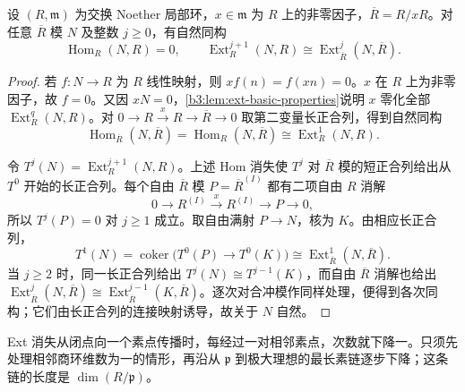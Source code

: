 \begin{lemma}[正则元换环]\label{b3:lem:regular-element-ext-change}
	设 \((R,\mathfrak m)\) 为交换 Noether 局部环，\(x\in\mathfrak m\) 为 \(R\) 上的非零因子，\(\overline R=R/xR\)。对任意 \(\overline R\) 模 \(N\) 及整数 \(j\ge0\)，有自然同构
	\[
		\operatorname{Hom}_R(N,R)=0,\qquad \operatorname{Ext}_R^{j+1}(N,R) \cong\operatorname{Ext}_{\overline R}^j(N,\overline R).
	\]
\end{lemma}
\begin{proof}
	若 \(f:N\rightarrow R\) 为 \(R\) 线性映射，则 \(xf(n)=f(xn)=0\)。\(x\) 在 \(R\) 上为非零因子，故 \(f=0\)。又因 \(xN=0\)，\cref{b3:lem:ext-basic-properties}说明 \(x\) 零化全部 \(\operatorname{Ext}_R^q(N,R)\)。对 \(0\rightarrow R\xrightarrow{x}R\rightarrow\overline R\rightarrow0\) 取第二变量长正合列，得到自然同构
	\[
		\operatorname{Hom}_{\overline R}(N,\overline R) =\operatorname{Hom}_R(N,\overline R) \cong\operatorname{Ext}_R^1(N,R).
	\]

	令 \(T^j(N)=\operatorname{Ext}_R^{j+1}(N,R)\)。上述 Hom 消失使 \(T^j\) 对 \(\overline R\) 模的短正合列给出从 \(T^0\) 开始的长正合列。每个自由 \(\overline R\) 模 \(P=\overline R^{(I)}\) 都有二项自由 \(R\) 消解
	\[
		0\longrightarrow R^{(I)}\xrightarrow{x}R^{(I)}\longrightarrow P\longrightarrow0,
	\]
	所以 \(T^j(P)=0\) 对 \(j\ge1\) 成立。取自由满射 \(P\rightarrow N\)，核为 \(K\)。由相应长正合列，
	\[
		T^1(N)=\operatorname{coker}\bigl(T^0(P)\longrightarrow T^0(K)\bigr) \cong\operatorname{Ext}_{\overline R}^1(N,\overline R).
	\]
	当 \(j\ge2\) 时，同一长正合列给出 \(T^j(N)\cong T^{j-1}(K)\)，而自由 \(\overline R\) 消解也给出 \(\operatorname{Ext}_{\overline R}^j(N,\overline R)\cong\operatorname{Ext}_{\overline R}^{j-1}(K,\overline R)\)。逐次对合冲模作同样处理，便得到各次同构；它们由长正合列的连接映射诱导，故关于 \(N\) 自然。
\end{proof}

Ext 消失从闭点向一个素点传播时，每经过一对相邻素点，次数就下降一。只须先处理相邻商环维数为一的情形，再沿从 \(\mathfrak p\) 到极大理想的最长素链逐步下降；这条链的长度是 \(\dim(R/\mathfrak p)\)。

